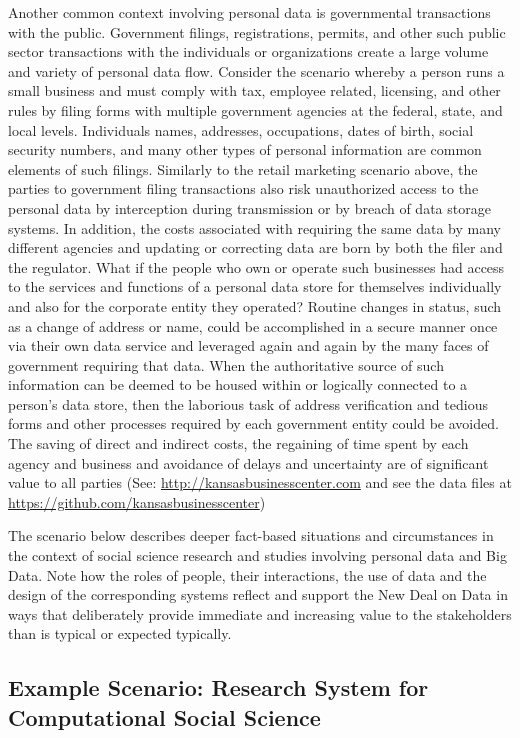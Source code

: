 Another common context involving personal data is governmental transactions with the public.  
Government filings, registrations, permits, and other such public sector transactions with the individuals or organizations create a large volume and variety of personal data flow.
Consider the scenario whereby a person runs a small business and must comply with tax, employee related, licensing, and other rules by filing forms with multiple government agencies at the federal, state, and local levels.
Individuals names, addresses, occupations, dates of birth, social security numbers, and many other types of personal information are common elements of such filings.
Similarly to the retail marketing scenario above, the parties to government filing transactions also risk unauthorized access to the personal data by interception during transmission or by breach of data storage systems.
In addition, the costs associated with requiring the same data by many different agencies and updating or correcting data are born by both the filer and the regulator.
What if the people who own or operate such businesses had access to the services and functions of a personal data store for themselves individually and also for the corporate entity they operated?
Routine changes in status, such as a change of address or name, could be accomplished in a secure manner once via their own data service and leveraged again and again by the many faces of government requiring that data. 
When the authoritative source of such information can be deemed to be housed within or logically connected to a person's data store, then the laborious task of address verification and tedious forms and other processes required by each government entity could be avoided.
The saving of direct and indirect costs, the regaining of time spent by each agency and business and avoidance of delays and uncertainty are of significant value to all parties (See: \url{http://kansasbusinesscenter.com} and see the data files at  \url{https://github.com/kansasbusinesscenter})

The scenario below describes deeper fact-based situations and circumstances in the context of social science research and studies involving personal data and Big Data.
Note how the roles of people, their interactions, the use of data and the design of the corresponding systems reflect and support the New Deal on Data in ways that deliberately provide immediate and increasing value to the stakeholders than is typical or expected typically.


 \subsection{Example Scenario: Research System for Computational Social Science}


